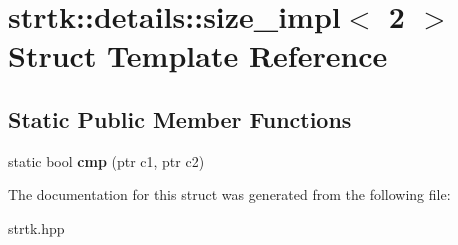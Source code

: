 \hypertarget{structstrtk_1_1details_1_1size__impl_3_012_01_4}{\section{strtk\-:\-:details\-:\-:size\-\_\-impl$<$ 2 $>$ Struct Template Reference}
\label{structstrtk_1_1details_1_1size__impl_3_012_01_4}
}
\subsection*{Static Public Member Functions}
\begin{DoxyCompactItemize}
\item 
\hypertarget{structstrtk_1_1details_1_1size__impl_3_012_01_4_a0de49bc5941664adc40c167b7b3468e2}{static bool {\bfseries cmp} (ptr c1, ptr c2)}\label{structstrtk_1_1details_1_1size__impl_3_012_01_4_a0de49bc5941664adc40c167b7b3468e2}

\end{DoxyCompactItemize}


The documentation for this struct was generated from the following file\-:\begin{DoxyCompactItemize}
\item 
strtk.\-hpp\end{DoxyCompactItemize}
